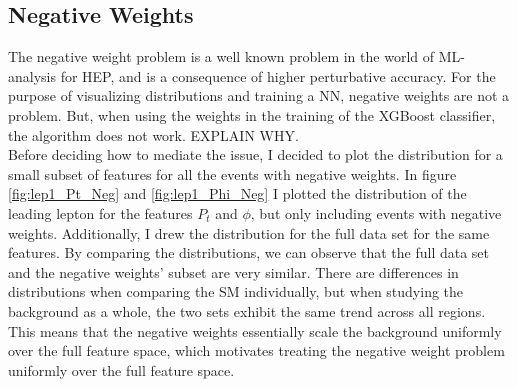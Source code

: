 \subsection{Negative Weights}\label{subsec:negWeights}
The negative weight problem is a well known problem in the world of ML-analysis for HEP, 
and is a consequence of higher perturbative accuracy. For the purpose of visualizing 
distributions and training a \ac{NN}, negative weights are not a problem. But, when using 
the weights in the training of the XGBoost classifier, the algorithm does not work. EXPLAIN
WHY. 
\\
Before deciding how to mediate the issue, I decided to plot the distribution for 
a small subset of features for all the events with negative weights.
In figure \ref{fig:lep1_Pt_Neg} and \ref{fig:lep1_Phi_Neg} I plotted the distribution of the leading 
lepton for the features $P_t$ and $\phi$, but only including events with negative weights.
Additionally, I drew the distribution for the full data set for the same features. By comparing the 
distributions, we can observe that the full data set and the negative weights' subset are very 
similar. There are differences in distributions when comparing the \ac{SM} individually, but when 
studying the background as a whole, the two sets exhibit the same trend across all regions. 
This means that the negative weights essentially scale the background uniformly over the full feature 
space, which motivates treating the negative weight problem uniformly over the full feature space.
